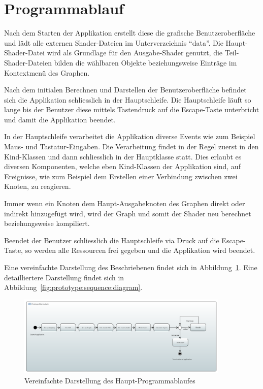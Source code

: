 
\section{Programmablauf}
\label{sec:prototype:sequence}

Nach dem Starten der Applikation erstellt diese die grafische
Benutzeroberfläche und lädt alle externen Shader-Dateien im Unterverzeichnis 
``data''. Die Haupt-Shader-Datei wird als Grundlage für den Ausgabe-Shader
genutzt, die Teil-Shader-Dateien bilden die wählbaren Objekte beziehungsweise
Einträge im Kontextmenü des Graphen.

Nach dem initialen Berechnen und Darstellen der Benutzeroberfläche befindet
sich die Applikation schliesslich in der Hauptschleife. Die Hauptschleife läuft
so lange bis der Benutzer diese mittels Tastendruck auf die Escape-Taste
unterbricht und damit die Applikation beendet.

In der Hauptschleife verarbeitet die Applikation diverse Events wie zum
Beispiel Maus- und Tastatur-Eingaben. Die Verarbeitung findet in der Regel
zuerst in den Kind-Klassen und dann schliesslich in der Hauptklasse statt. Dies
erlaubt es diversen Komponenten, welche eben Kind-Klassen der Applikation sind,
auf Ereignisse, wie zum Beispiel dem Erstellen einer Verbindung zwischen zwei
Knoten, zu reagieren.

Immer wenn ein Knoten dem Haupt-Ausgabeknoten des Graphen direkt oder indirekt
hinzugefügt wird, wird der Graph und somit der Shader neu berechnet
beziehungsweise kompiliert.

Beendet der Benutzer schliesslich die Hauptschleife via Druck auf die
Escape-Taste, so werden alle Ressourcen frei gegeben und die Applikation wird
beendet.

Eine vereinfachte Darstellung des Beschriebenen findet sich in
Abbildung~\ref{fig:prototype:sequence:activity}. Eine detailliertere
Darstellung findet sich in Abbildung~\ref{fig:prototype:sequence:diagram}.

\begin{figure}[H]
    \centering
    \includegraphics[width=0.9\textwidth]{img/prototype_activity_diagram.png}
    \caption{Vereinfachte Darstellung des Haupt-Programmablaufes
        \protect\footnotemark}\label{fig:prototype:sequence:activity}
\end{figure}

